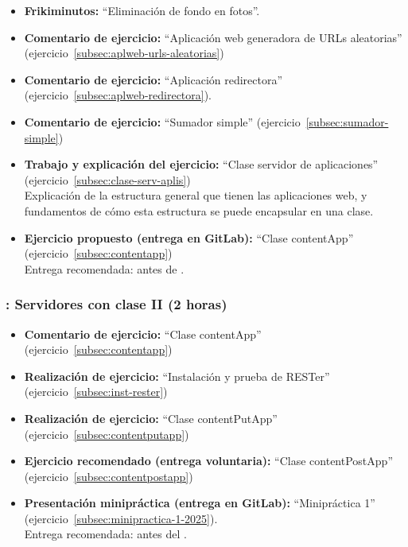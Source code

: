 \documentclass[a4paper,12pt]{article}
\begin{document}
\begin{itemize}
\item \textbf{Frikiminutos:} ``Eliminación de fondo en fotos''.
\item \textbf{Comentario de ejercicio:} ``Aplicación web generadora de URLs aleatorias'' (ejercicio~\ref{subsec:aplweb-urls-aleatorias})
\item \textbf{Comentario de ejercicio:} ``Aplicación redirectora'' (ejercicio~\ref{subsec:aplweb-redirectora}).
\item \textbf{Comentario de ejercicio:} ``Sumador simple'' (ejercicio~\ref{subsec:sumador-simple}) 
\item \textbf{Trabajo y explicación del ejercicio:} ``Clase servidor de aplicaciones'' (ejercicio~\ref{subsec:clase-serv-aplis}) \\
  Explicación de la estructura general que tienen las aplicaciones web, y fundamentos de cómo esta estructura se puede encapsular en una clase.
\item \textbf{Ejercicio propuesto (entrega en GitLab):}  ``Clase contentApp'' (ejercicio~\ref{subsec:contentapp}) \\
  Entrega recomendada: antes de \martesF.
\end{itemize}


\subsubsection{\martesF: Servidores con clase II (2 horas)}
\label{cal:martesF}

\begin{itemize}
\item \textbf{Comentario de ejercicio:}  ``Clase contentApp'' (ejercicio~\ref{subsec:contentapp})
\item \textbf{Realización de ejercicio:}  ``Instalación y prueba de RESTer'' (ejercicio~\ref{subsec:inst-rester})
\item \textbf{Realización de ejercicio:}  ``Clase contentPutApp'' (ejercicio~\ref{subsec:contentputapp})
\item \textbf{Ejercicio recomendado (entrega voluntaria):} ``Clase contentPostApp'' (ejercicio~\ref{subsec:contentpostapp})
\item \textbf{Presentación minipráctica (entrega en GitLab):} ``Minipráctica 1'' (ejercicio~\ref{subsec:minipractica-1-2025}). \\
    Entrega recomendada: antes del \martesH.
\end{itemize}
\end{document}
